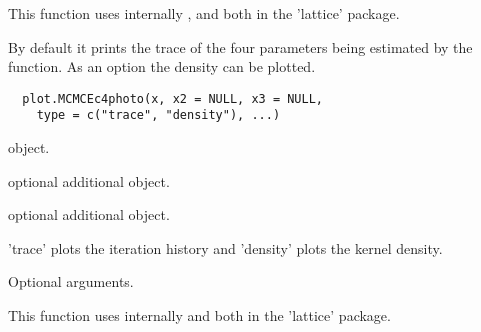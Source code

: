 \documentclass[letterpaper]{book}
\begin{document}
%
\begin{Details}\relax
This function uses internally
,
 and
 both in the
'lattice' package.
\end{Details}
%
\begin{SeeAlso}\relax
{}
\end{SeeAlso}
%
\begin{Description}\relax
By default it prints the trace of the four parameters
being estimated by the 
function. As an option the density can be plotted.
\end{Description}
%
\begin{Usage}
\begin{verbatim}
  plot.MCMCEc4photo(x, x2 = NULL, x3 = NULL,
    type = c("trace", "density"), ...)
\end{verbatim}
\end{Usage}
%
\begin{Arguments}
\begin{ldescription}
\item[\code{x}]  object.

\item[\code{x2}] optional additional 
object.

\item[\code{x3}] optional additional 
object.

\item[\code{type}] 'trace' plots the iteration history and
'density' plots the kernel density.

\item[\code{...}] Optional arguments.
\end{ldescription}
\end{Arguments}
%
\begin{Details}\relax
This function uses internally
 and
 both in the 'lattice'
package.
\end{Details}
%
\begin{SeeAlso}\relax
{}
\end{SeeAlso}
\end{document}
